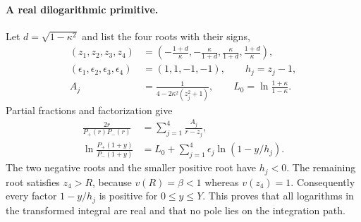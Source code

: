 \paragraph{A real dilogarithmic primitive.}
Let $d=\sqrt{1-\kappa^2}$ and list the four roots with their signs,
\begin{align}
 (z_1,z_2,z_3,z_4)&=
 \left(-\frac{1+d}{\kappa},-\frac{\kappa}{1+d},
 \frac{\kappa}{1+d},\frac{1+d}{\kappa}\right),\\
 (\epsilon_1,\epsilon_2,\epsilon_3,\epsilon_4)&=(1,1,-1,-1),
 \qquad h_j=z_j-1,\\
 A_j&=\frac1{4-2\kappa^2(z_j^2+1)},\qquad
 L_0=\ln\frac{1+\kappa}{1-\kappa}.
\end{align}
Partial fractions and factorization give
\begin{align}
 \frac{2r}{P_+(r)P_-(r)}&=\sum_{j=1}^4\frac{A_j}{r-z_j},\\
 \ln\frac{P_+(1+y)}{P_-(1+y)}
 &=L_0+\sum_{j=1}^4\epsilon_j\ln(1-y/h_j).
\end{align}
The two negative roots and the smaller positive root have $h_j<0$.
The remaining root satisfies $z_4>R$, because $v(R)=\beta<1$
whereas $v(z_4)=1$. Consequently every factor $1-y/h_j$ is positive
for $0\leq y\leq Y$. This proves that all logarithms in the transformed
integral are real and that no pole lies on the integration path.

